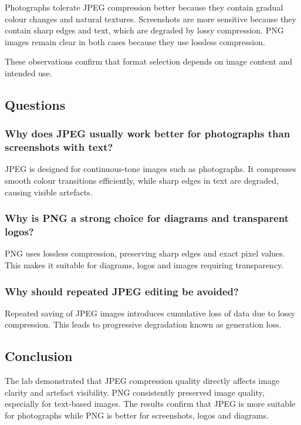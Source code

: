 \documentclass[12pt,a4paper]{article}
\begin{document}
Photographs tolerate JPEG compression better because they contain gradual colour changes and natural textures. Screenshots are more sensitive because they contain sharp edges and text, which are degraded by lossy compression. PNG images remain clear in both cases because they use lossless compression.

These observations confirm that format selection depends on image content and intended use.

\subsection{Questions}

\subsubsection{Why does JPEG usually work better for photographs than screenshots with text?}

JPEG is designed for continuous-tone images such as photographs. It compresses smooth colour transitions efficiently, while sharp edges in text are degraded, causing visible artefacts.

\subsubsection{Why is PNG a strong choice for diagrams and transparent logos?}

PNG uses lossless compression, preserving sharp edges and exact pixel values. This makes it suitable for diagrams, logos and images requiring transparency.

\subsubsection{Why should repeated JPEG editing be avoided?}

Repeated saving of JPEG images introduces cumulative loss of data due to lossy compression. This leads to progressive degradation known as generation loss.

\subsection{Conclusion}

The lab demonstrated that JPEG compression quality directly affects image clarity and artefact visibility. PNG consistently preserved image quality, especially for text-based images. The results confirm that JPEG is more suitable for photographs while PNG is better for screenshots, logos and diagrams.
\end{document}
